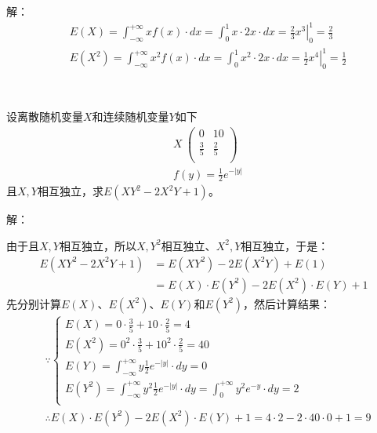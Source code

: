 解：
\begin{align*}
&E\left( X \right) =\int_{-\infty}^{+\infty}{xf\left( x \right) \cdot dx}=\int_0^1{x\cdot 2x\cdot dx}=\left. \frac{2}{3}x^3 \right|_{0}^{1}=\frac{2}{3} \\
&E\left( X^2 \right) =\int_{-\infty}^{+\infty}{x^2f\left( x \right) \cdot dx}=\int_0^1{x^2\cdot 2x\cdot dx}=\left. \frac{1}{2}x^4 \right|_{0}^{1}=\frac{1}{2}
\end{align*}

~

\begin{example}
设离散随机变量$X$和连续随机变量$Y$如下
\begin{align*}
&X~\left( \begin{matrix}
    0&		10\\
    \frac{3}{5}&		\frac{2}{5}\\
\end{matrix} \right) \\
&f\left( y \right) =\frac{1}{2}e^{-\left| y \right|}
\end{align*}
且$X,Y$相互独立，求$E\left( XY^2-2X^2Y+1 \right) $。
\end{example}

解：

由于且$X,Y$相互独立，所以$X,Y^2$相互独立、$X^2,Y$相互独立，于是：
\begin{align*}
E\left( XY^2-2X^2Y+1 \right) &=E\left( XY^2 \right) -2E\left( X^2Y \right) +E\left( 1 \right) \\
&=E\left( X \right) \cdot E\left( Y^2 \right) -2E\left( X^2 \right) \cdot E\left( Y \right) +1
\end{align*}
先分别计算$E\left( X \right) $、$E\left( X^2 \right) $、$E\left( Y \right) $和$E\left( Y^2 \right) $，然后计算结果：
\begin{align*}
&\because \begin{cases}
	E\left( X \right) =0\cdot \frac{3}{5}+10\cdot \frac{2}{5}=4\\
	E\left( X^2 \right) =0^2\cdot \frac{3}{5}+10^2\cdot \frac{2}{5}=40\\
	E\left( Y \right) =\int_{-\infty}^{+\infty}{y\frac{1}{2}e^{-\left| y \right|}\cdot dy}=0\\
	E\left( Y^2 \right) =\int_{-\infty}^{+\infty}{y^2\frac{1}{2}e^{-\left| y \right|}\cdot dy}=\int_0^{+\infty}{y^2e^{-y}\cdot dy}=2\\
\end{cases} \\
&\therefore E\left( X \right) \cdot E\left( Y^2 \right) -2E\left( X^2 \right) \cdot E\left( Y \right) +1=4\cdot 2-2\cdot 40\cdot 0+1=9
\end{align*}





